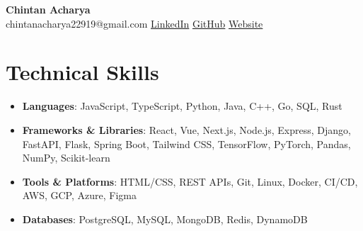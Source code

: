\documentclass[a4paper,10pt]{article}
\begin{document}
\pagestyle{empty}

\begin{center}
    {\LARGE\bfseries Chintan Acharya}\\[6pt]
    {\small chintanacharya22919@gmail.com \textbar{}  \textbar{} \href{https://www.linkedin.com/in/chintan-acharya-b5757a192/}{LinkedIn} \textbar{} \href{https://github.com/chintan-27}{GitHub} \textbar{} \href{https://thecka.tech/}{Website}}
\end{center}

\vspace{-8pt}

\section*{Technical Skills}
\vspace{-3pt}
\begin{itemize}
   \item \textbf{Languages}: JavaScript, TypeScript, Python, Java, C++, Go, SQL, Rust
\item \textbf{Frameworks & Libraries}: React, Vue, Next.js, Node.js, Express, Django, FastAPI, Flask, Spring Boot, Tailwind CSS, TensorFlow, PyTorch, Pandas, NumPy, Scikit-learn
\item \textbf{Tools & Platforms}: HTML/CSS, REST APIs, Git, Linux, Docker, CI/CD, AWS, GCP, Azure, Figma
\item \textbf{Databases}: PostgreSQL, MySQL, MongoDB, Redis, DynamoDB
\end{itemize}

\vspace{-8pt}
\end{document}
